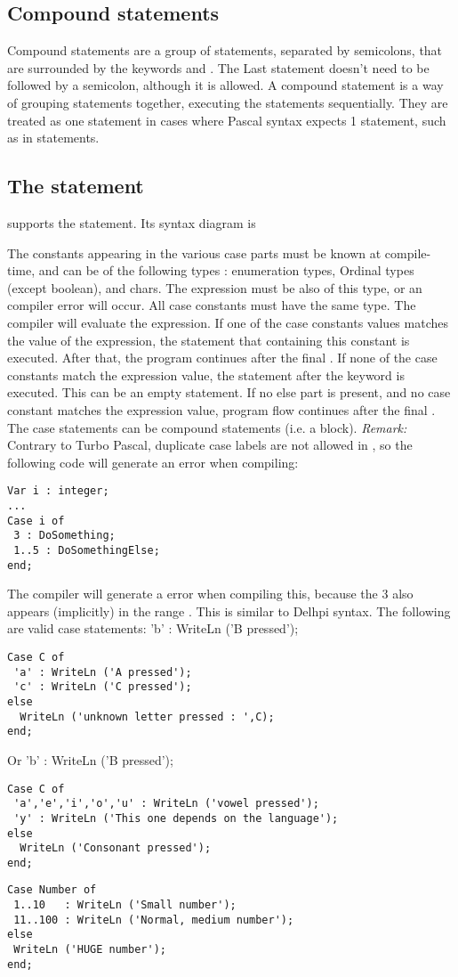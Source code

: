 \documentclass{report}
\begin{document}
\subsection{Compound statements}
Compound statements are a group of statements, separated by semicolons,
that are surrounded by the keywords  and . The
Last statement doesn't need to be followed by a semicolon, although it is
allowed. A compound statement is a way of grouping statements together,
executing the statements sequentially. They are treated as one statement
in cases where Pascal syntax expects 1 statement, such as in
 statements.

\subsection{The  statement}
\fpc supports the  statement. Its syntax diagram is

The constants appearing in the various case parts must be known at
compile-time, and can be of the following types : enumeration types,
Ordinal types (except boolean), and chars. The expression must be also of
this type, or an compiler error will occur. All case constants must
have the same type.
The compiler will evaluate the expression. If one of the case constants
values matches the value of the expression, the statement that containing
this constant is executed. After that, the program continues after the final
.
If none of the case constants match the expression value, the statement
after the  keyword is executed. This can be an empty statement.
If no else part is present, and no case constant matches the expression
value, program flow continues after the final .
The case statements can be compound statements
(i.e. a  block).
{\em Remark:} Contrary to Turbo Pascal, duplicate case labels are not
allowed in \fpc, so the following code will generate an error when
compiling:
\begin{verbatim}
Var i : integer;
...
Case i of
 3 : DoSomething;
 1..5 : DoSomethingElse;
end;
\end{verbatim}
The compiler will generate a  error when compiling
this, because the 3 also appears (implicitly) in the range . This
is similar to Delhpi syntax.
The following are valid case statements:
 'b' : WriteLn ('B pressed');
\begin{verbatim}
Case C of
 'a' : WriteLn ('A pressed');
 'c' : WriteLn ('C pressed');
else
  WriteLn ('unknown letter pressed : ',C);
end;
\end{verbatim}
Or
 'b' : WriteLn ('B pressed');
\begin{verbatim}
Case C of
 'a','e','i','o','u' : WriteLn ('vowel pressed');
 'y' : WriteLn ('This one depends on the language');
else
  WriteLn ('Consonant pressed');
end;
\end{verbatim}
\begin{verbatim}
Case Number of
 1..10   : WriteLn ('Small number');
 11..100 : WriteLn ('Normal, medium number');
else
 WriteLn ('HUGE number');
end;
\end{verbatim}
\end{document}
